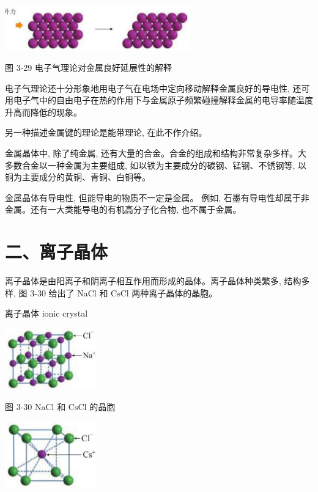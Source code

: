 \documentclass[10pt]{article}
\begin{document}
\begin{center}
\includegraphics[max width=0.6\textwidth]{images/0190e026-5a11-7df7-bd27-54d09026ba7a_89_768987.jpg}
\end{center}

图 3-29 电子气理论对金属良好延展性的解释

电子气理论还十分形象地用电子气在电场中定向移动解释金属良好的导电性, 还可用电子气中的自由电子在热的作用下与金属原子频繁碰撞解释金属的电导率随温度升高而降低的现象。

另一种描述金属键的理论是能带理论, 在此不作介绍。

金属晶体中, 除了纯金属, 还有大量的合金。合金的组成和结构非常复杂多样。大多数合金以一种金属为主要组成, 如以铁为主要成分的碳钢、锰钢、不锈钢等, 以铜为主要成分的黄铜、青铜、白铜等。

金属晶体有导电性, 但能导电的物质不一定是金属。 例如, 石墨有导电性却属于非金属。还有一大类能导电的有机高分子化合物, 也不属于金属。

\section*{二、离子晶体}

离子晶体是由阳离子和阴离子相互作用而形成的晶体。离子晶体种类繁多, 结构多样, 图 3-30 给出了 \(\mathrm{{NaCl}}\) 和 \(\mathrm{{CsCl}}\) 两种离子晶体的晶胞。

\begin{mdframed}

离子晶体 ionic crystal

\end{mdframed}

\begin{center}
\includegraphics[max width=0.3\textwidth]{images/0190e026-5a11-7df7-bd27-54d09026ba7a_90_237066.jpg}
\end{center}

图 3-30 NaCl 和 \(\mathrm{{CsCl}}\) 的晶胞

\begin{center}
\includegraphics[max width=0.3\textwidth]{images/0190e026-5a11-7df7-bd27-54d09026ba7a_90_715312.jpg}
\end{center}
\end{document}
